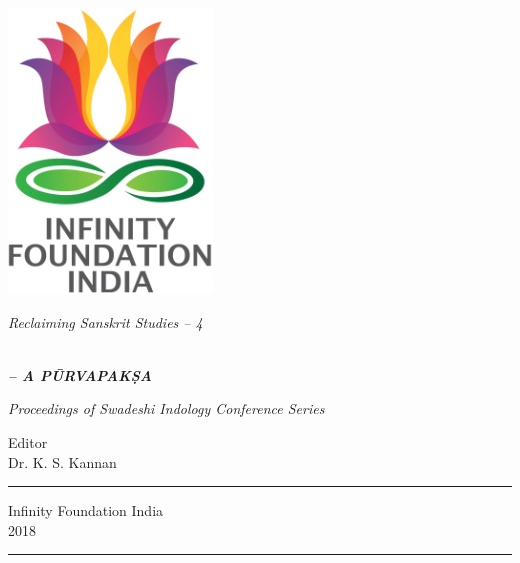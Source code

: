 \thispagestyle{empty}
\begin{center}
\includegraphics[scale=0.3]{figures/logo.png}
\bigskip

{\fontsize{10}{14}\selectfont\sl
Reclaiming Sanskrit Studies -- 4}

\bigskip
\end{center}
\medskip

\begin{center}
{\fontsize{20}{24}}\\[10pt]
{\sl\bfseries{}\fontsize{20}{24}\selectfont -- A PŪRVAPAKṢA}
\bigskip

{\sl\small Proceedings of Swadeshi Indology Conference Series}

\vfill


{\fontsize{14}{18}\selectfont 
Editor\\
Dr. K. S. Kannan\par
}
\vfill

\rule{5cm}{1pt}

{\fontsize{12}{14}\selectfont
Infinity Foundation India\\[4pt]
2018}

\rule{5cm}{1pt}
\end{center}




